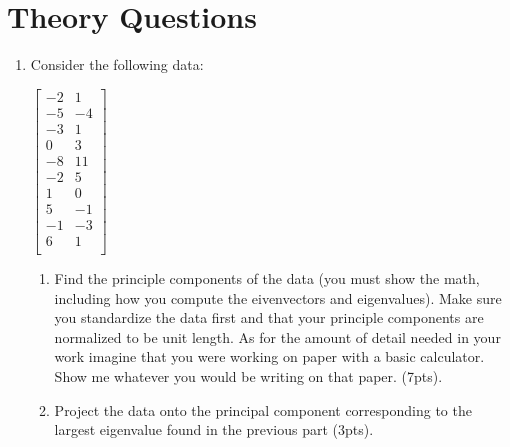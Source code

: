 \documentclass[12pt]{article}
\begin{document}
\section{Theory Questions}
\begin{enumerate}

\item Consider the following data:\\
\begin{center}
$
 \begin{bmatrix}
	-2 & 1\\
	-5 & -4\\	
	-3 & 1\\
	0 & 3\\
	-8 & 11\\
	-2 & 5\\
	1 & 0\\
	5 & -1\\
	-1 & -3\\
	6 & 1\\
\end{bmatrix}
$
\end{center}
	\begin{enumerate}
	\item Find the principle components of the data (you must show the math, including how you compute the eivenvectors and eigenvalues).  Make sure you standardize the data first and that your principle components are normalized to be unit length.  As for the amount of detail needed in your work imagine that you were working on paper with a basic calculator.  Show me whatever you would be writing on that paper.  (7pts).
	\item Project the data onto the principal component corresponding to the largest eigenvalue found in the previous part (3pts).
	\end{enumerate}
\end{enumerate}


\newpage
\end{document}
